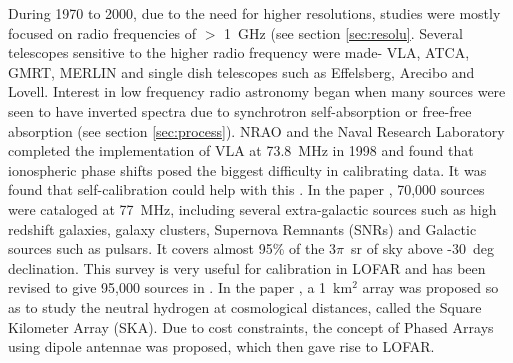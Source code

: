 \documentclass[../main/thesis_msc.tex]{subfiles}
\begin{document}
During 1970 to 2000, due to the need for higher resolutions, studies were mostly focused on radio frequencies of $>$ 1~GHz (see section \ref{sec:resolu}. Several telescopes sensitive to the higher radio frequency were made- VLA, ATCA, GMRT, MERLIN and single dish telescopes such as Effelsberg, Arecibo and Lovell. Interest in low frequency radio astronomy began when many sources were seen to have inverted spectra due to synchrotron self-absorption or free-free absorption (see section \ref{sec:process}). NRAO and the Naval Research Laboratory completed the implementation of VLA at 73.8~MHz in 1998 and found that ionospheric phase shifts posed the biggest difficulty in calibrating data. It was found that self-calibration could help with this \citep{74MHz}. In the paper \citet{vlss}, 70,000 sources were cataloged  at 77~MHz, including several extra-galactic sources such as high redshift galaxies, galaxy clusters, Supernova Remnants (SNRs) and Galactic sources such as pulsars. It covers almost  95\% of the 3$\pi$~sr of sky above -30~deg declination. This survey is very useful for calibration in LOFAR and has been revised to give 95,000 sources in \citet{vlss2}. In the paper \citet{ska}, a 1~km$^2$ array was proposed so as to study the neutral hydrogen at cosmological distances, called the Square Kilometer Array (SKA). Due to cost constraints, the concept of Phased Arrays \citep{lof1} using dipole antennae was proposed, which then gave rise to LOFAR.
\end{document}
